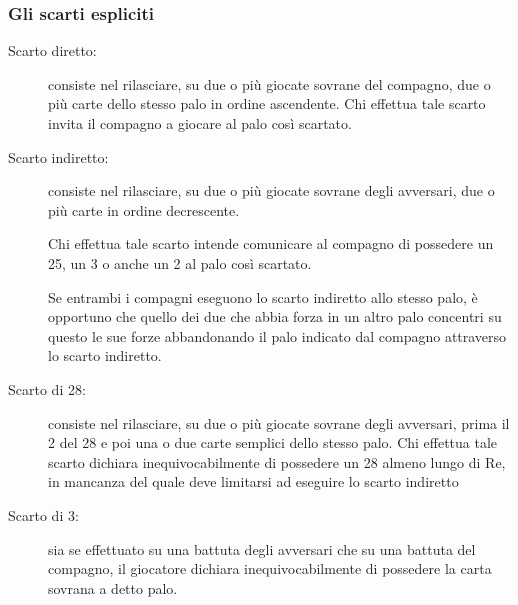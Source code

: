 \documentclass[italian,a4paper]{article}
\begin{document}
\subsubsection{Gli scarti espliciti}
\begin{description}
\item[Scarto diretto:] consiste nel rilasciare, su due o più giocate sovrane del compagno, due o più carte dello stesso palo in ordine ascendente.
Chi effettua tale scarto invita il compagno a giocare al palo così scartato.
\item[Scarto indiretto:] consiste nel rilasciare, su due o più giocate sovrane degli avversari, due o più carte in ordine decrescente.
 
Chi effettua tale scarto intende comunicare al compagno di possedere un 25, un 3 o anche un 2 al palo così scartato.
 
Se entrambi i compagni eseguono lo scarto indiretto allo stesso palo, è opportuno che quello dei due che abbia forza in un altro palo concentri su questo le sue forze abbandonando il palo indicato dal compagno attraverso lo scarto indiretto.
\item[Scarto di 28:] consiste nel rilasciare, su due o più giocate sovrane degli avversari, prima il 2 del 28 e poi una o due carte semplici dello stesso palo.
Chi effettua tale scarto dichiara inequivocabilmente di possedere un 28 almeno lungo di Re, in mancanza del quale deve limitarsi ad eseguire lo scarto indiretto
\item[Scarto di 3:] sia se effettuato su una battuta degli avversari che su una battuta del compagno, il giocatore dichiara inequivocabilmente di possedere la carta sovrana a detto palo.
\end{description}
\end{document}
